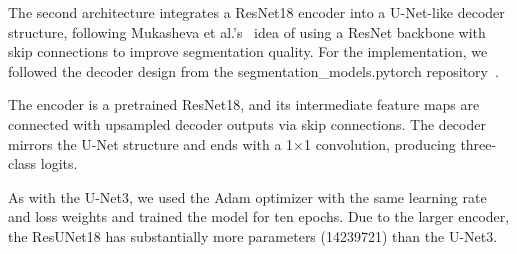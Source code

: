 The second architecture integrates a ResNet18 encoder into a U-Net-like decoder structure, following Mukasheva et al.'s~\cite{mukasheva2024modification} idea of using a ResNet backbone with skip connections to improve segmentation quality.
For the implementation, we followed the decoder design from the segmentation\_models.pytorch repository~\cite{Iakubovskii:2019}.

The encoder is a pretrained ResNet18, and its intermediate feature maps are connected with upsampled decoder outputs via skip connections.
The decoder mirrors the U-Net structure and ends with a 1×1 convolution, producing three-class logits.

As with the U-Net3, we used the Adam optimizer with the same learning rate and loss weights and trained the model for ten epochs.
Due to the larger encoder, the ResUNet18 has substantially more parameters (\qty{14239721}{}) than the U-Net3.